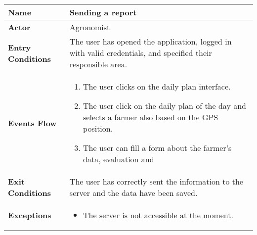 \begin{center}
\renewcommand{\arraystretch}{1.25}
\begin{tabular}{|l|>{\raggedright\arraybackslash}m{12cm}|}
    \hline
    \textbf{Name} & Sending a report\\
    \hline
   	\textbf{Actor} & Agronomist\\
    \hline
    \textbf{Entry Conditions} & The user has opened the application, logged in with valid credentials, and specified their responsible area.\\    
    \hline
    \textbf{Events Flow} & 
    	\begin{enumerate}
            \item The user clicks on the daily plan interface.
            \item The user click on the daily plan of the day and selects a farmer also based on the GPS position.
            \item The user can fill a form about the farmer's data, evaluation and 
       \end{enumerate}\\
    \hline
    \textbf{Exit Conditions} & The user has correctly sent the information to the server and the data have been saved.\\
    \hline
    \textbf{Exceptions} & 
    	\begin{itemize}
	    	\item The server is not accessible at the moment.
    	\end{itemize}\\
    \hline 
\end{tabular}
\end{center}
